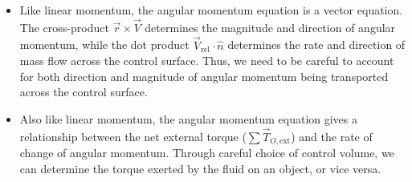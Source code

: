 ﻿\documentclass[12pt]{article}
\begin{document}
\begin{notebox}
\begin{itemize}
    \item Like linear momentum, the angular momentum equation is a vector equation. The cross-product $\vec{r}\times\vec{V}$ determines the magnitude and direction of angular momentum, while the dot product $\vec{V}_{\mathrm{rel}}\cdot\hat{n}$ determines the rate and direction of mass flow across the control surface. Thus, we need to be careful to account for both direction and magnitude of angular momentum being transported across the control surface.
    \item Also like linear momentum, the angular momentum equation gives a relationship between the net external torque ($\sum \vec{T}_{O,\mathrm{ext}}$) and the rate of change of angular momentum. Through careful choice of control volume, we can determine the torque exerted by the fluid on an object, or vice versa.
\end{itemize}
\end{notebox}
\end{document}
